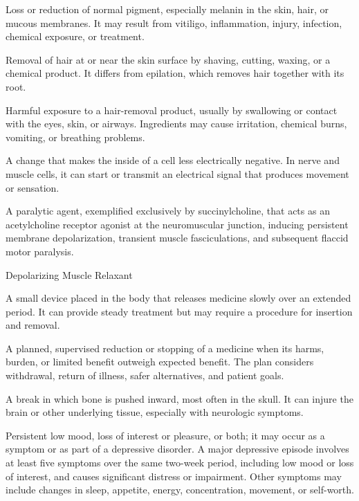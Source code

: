  Loss or reduction of normal pigment, especially melanin in the skin, hair, or mucous membranes. It may result from vitiligo, inflammation, injury, infection, chemical exposure, or treatment.

 Removal of hair at or near the skin surface by shaving, cutting, waxing, or a chemical product. It differs from epilation, which removes hair together with its root.

 Harmful exposure to a hair-removal product, usually by swallowing or contact with the eyes, skin, or airways. Ingredients may cause irritation, chemical burns, vomiting, or breathing problems.

 A change that makes the inside of a cell less electrically negative. In nerve and muscle cells, it can start or transmit an electrical signal that produces movement or sensation.

 A paralytic agent, exemplified exclusively by succinylcholine, that acts as an acetylcholine receptor agonist at the neuromuscular junction, inducing persistent membrane depolarization, transient muscle fasciculations, and subsequent flaccid motor paralysis.

\synonyms
Depolarizing Muscle Relaxant

 A small device placed in the body that releases medicine slowly over an extended period. It can provide steady treatment but may require a procedure for insertion and removal.

 A planned, supervised reduction or stopping of a medicine when its harms, burden, or limited benefit outweigh expected benefit. The plan considers withdrawal, return of illness, safer alternatives, and patient goals.

 A break in which bone is pushed inward, most often in the skull. It can injure the brain or other underlying tissue, especially with neurologic symptoms.

 Persistent low mood, loss of interest or pleasure, or both; it may occur as a symptom or as part of a depressive disorder.
A major depressive episode involves at least five symptoms over the same two-week period, including low mood or loss of interest, and causes significant distress or impairment.
Other symptoms may include changes in sleep, appetite, energy, concentration, movement, or self-worth.


